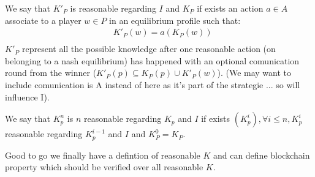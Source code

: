\begin{mydef}
	We say that $K'_P$ is reasonable regarding $I$ and $K_P$ if exists an action $a \in A$ associate to a player $w \in P$ in an equilibrium profile such that: 	\begin{eqnarray*}	
		& K'_P(w) = a(K_P(w)) \\
	\end{eqnarray*}	
	$K'_P$ represent all the possible knowledge after one reasonable action (on belonging to a nash equilibrium) has happened with an optional comunication round from the winner ($K'_P(p) \subseteq K_P(p) \cup K'_P(w)$).  (We may want to include comunication is A instead of here as it's part of the strategie ... so will influence I).
\end{mydef}

\begin{mydef}
	We say that $K^n_p$ is $n$ reasonable regarding $K_p$ and $I$ if exists $(K^i_p), \forall i \leq n, K^i_p$ reasonable regarding $K^{i-1}_p$ and $I$ and $K^0_P = K_P$.   
\end{mydef}

Good to go we finally have a defintion of reasonable $K$ and can define blockchain property which should be verified over all reasonable $K$.

